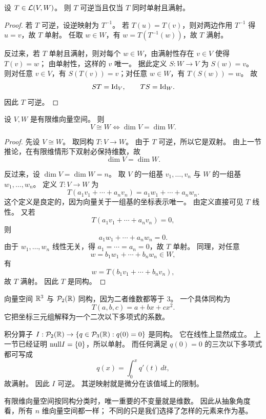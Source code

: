 \begin{proposition} 设 $T\in\mathcal{L}(V,W)$。 则 $T$ 可逆当且仅当 $T$ 同时单射且满射。 \end{proposition}

\begin{proof} 若 $T$ 可逆，设逆映射为 $T^{-1}$。 若 $T(u)=T(v)$，则对两边作用 $T^{-1}$ 得 $u=v$，故 $T$ 单射。
任取 $w\in W$，有 $w=T(T^{-1}(w))$，故 $T$ 满射。

反过来，若 $T$ 单射且满射，则对每个 $w\in W$，由满射性存在 $v\in V$ 使得 $T(v)=w$； 由单射性，这样的 $v$ 唯一。 据此定义 $S:W\to
V$ 为 $S(w)=v$。 则对任意 $v\in V$，有 $S(T(v))=v$；对任意 $w\in W$，有 $T(S(w))=w$。 故 \[
ST=\mathrm{Id}_V,\qquad TS=\mathrm{Id}_W. \] 因此 $T$ 可逆。 \end{proof}

\begin{theorem} 设 $V,W$ 是有限维向量空间。 则 \[ V\cong W \iff \dim V=\dim W. \] \end{theorem}

\begin{proof} 先设 $V\cong W$。 取同构 $T:V\to W$。 由于 $T$ 可逆，所以它是双射。 由上一节推论，在有限维情形下双射必保持维数，故
\[ \dim V=\dim W. \]

反过来，设 $\dim V=\dim W=n$。 取 $V$ 的一组基 $v_1,\dots,v_n$ 与 $W$ 的一组基 $w_1,\dots,w_n$。 定义
$T:V\to W$ 为 \[ T(a_1v_1+\cdots+a_nv_n)=a_1w_1+\cdots+a_nw_n. \]
这个定义是良定的，因为向量关于一组基的坐标表示唯一。 由定义直接可见 $T$ 线性。 又若 \[ T(a_1v_1+\cdots+a_nv_n)=0, \] 则 \[
a_1w_1+\cdots+a_nw_n=0. \] 由于 $w_1,\dots,w_n$ 线性无关，得 $a_1=\cdots=a_n=0$，故 $T$ 单射。 同理，对任意
\[ w=b_1w_1+\cdots+b_nw_n\in W, \] 有 \[ w=T(b_1v_1+\cdots+b_nv_n), \] 故 $T$ 满射。 因此 $T$
是同构。 \end{proof}

\begin{example} 向量空间 $\mathbb{R}^3$ 与 $\mathcal{P}_2(\mathbb{R})$ 同构，因为二者维数都等于 $3$。 一个具体同构为 \[
T(a,b,c)=a+bx+cx^2. \] 它把坐标三元组解释为一个二次以下多项式的系数。 \end{example}

\begin{example} 积分算子 $I:\mathcal{P}_2(\mathbb{R})\to\{q\in\mathcal{P}_3(\mathbb{R}):q(0)=0\}$ 是同构。 它在线性上显然成立。
上一节已经证明 $\mathrm{null} I=\{0\}$，所以单射。 而任何满足 $q(0)=0$ 的三次以下多项式都可写成 \[ q(x)=\int_0^x q'(t)\,dt, \]
故满射。 因此 $I$ 可逆。 其逆映射就是微分在该值域上的限制。 \end{example}

\begin{remark} 有限维向量空间按同构分类时，唯一重要的不变量就是维数。 因此从抽象角度看，所有 $n$ 维向量空间都一样；
不同的只是我们选择了怎样的元素来作为基。 \end{remark}

